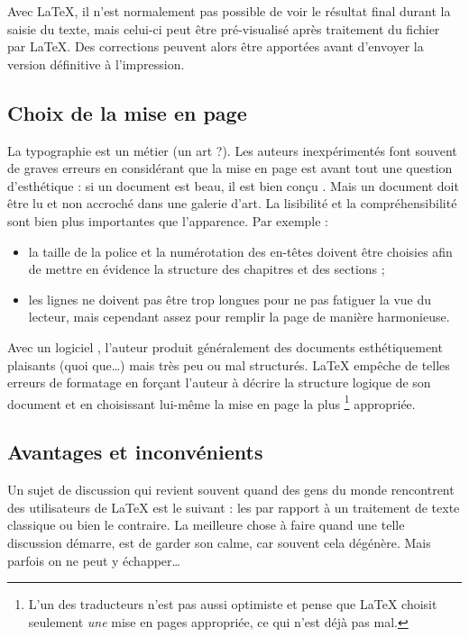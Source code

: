 Avec \LaTeX{}, il n'est normalement pas possible de voir le résultat
final durant la saisie du texte, mais celui-ci peut être
pré-visualisé après traitement du fichier par \LaTeX{}. Des corrections
peuvent alors être apportées avant d'envoyer la version définitive
à l'impression.

\subsection{Choix de la mise en page}

La typographie est un métier (un art ?). Les auteurs inexpérimentés
font souvent de graves erreurs en considérant que la mise en page est
avant tout une question d'esthétique : \og si un document est beau, il
est bien conçu \fg{}. Mais un document doit être lu et non accroché dans
une galerie d'art. La lisibilité et la compréhensibilité sont bien
plus importantes que l'apparence. Par exemple :
\begin{itemize}
\item la taille de la police et la numérotation des en-têtes doivent
      être choisies afin de mettre en évidence la structure des
      chapitres et des sections ;
\item les lignes ne doivent pas être trop longues pour ne pas fatiguer
      la vue du lecteur, mais cependant assez pour remplir la page de manière
      harmonieuse.
\end{itemize}

Avec un logiciel , l'auteur produit généralement des
documents esthétiquement plaisants (quoi que\dots) mais très peu ou
mal structurés. \LaTeX{} empêche de telles erreurs de formatage en
forçant l'auteur à décrire la structure logique de son document et en
choisissant lui-même la mise en page la plus
\footnote{L'un des traducteurs n'est pas aussi optimiste et pense que \LaTeX{}
  choisit seulement \emph{une} mise en pages appropriée, ce qui n'est déjà pas
  mal. \NdT} appropriée.


\subsection{Avantages et inconvénients}

Un sujet de discussion qui  revient souvent quand des gens du monde
 rencontrent des utilisateurs de \LaTeX{} est le
suivant : \og les  par rapport à un
traitement de texte classique \fg{} ou bien le contraire.
La meilleure chose à faire quand une telle discussion démarre, est de
garder son calme, car souvent cela dégénère. Mais parfois on ne peut y
échapper\dots

